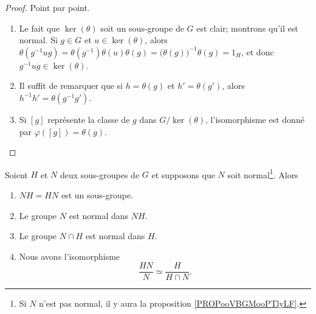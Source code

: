 \begin{proof}
	Point par point.
	\begin{enumerate}
		\item
		      Le fait que  \( \ker(\theta)\) soit un sous-groupe de \( G\) est clair; montrons qu'il est normal. Si \( g \in G \) et \( u \in \ker(\theta)\), alors \(\theta (g^{-1} u g) = \theta(g^{-1})\theta(u)\theta(g) = \bigl(\theta(g)\bigr)^{-1}\theta(g) = 1_H \), et donc \( g^{-1} u g \in \ker(\theta)\).
		\item
		      Il suffit de remarquer que si \( h = \theta(g) \) et \( h' = \theta(g') \), alors \( h^{-1} h' = \theta(g^{-1} g') \).
		\item
		      Si \( [g]\) représente la classe de \( g\) dans \( G/\ker(\theta)\), l'isomorphisme est donné par \( \varphi([g])=\theta(g)\).
	\end{enumerate}
\end{proof}

\begin{theorem}   \label{THOooURXUooQJvkjx}
    Soient \( H\) et \( N\) deux sous-groupes de \( G\) et supposons que \( N\) soit normal\footnote{Si \( N\) n'est pas normal, il y aura la proposition \ref{PROPooVBGMooPTlyLF}.}. Alors
	\begin{enumerate}
		\item
		      \( NH=HN\) est un sous-groupe.
		\item
		      Le groupe \( N\) est normal dans \( NH\).
		\item
		      Le groupe \( N\cap H\) est normal dans \( H\).
		\item   \label{ItemjRPajc}
		      Nous avons l'isomorphisme
              \begin{equation}
			      \frac{ HN }{ N }\simeq\frac{ H }{ H\cap N }.
		      \end{equation}
	\end{enumerate}
\end{theorem}

